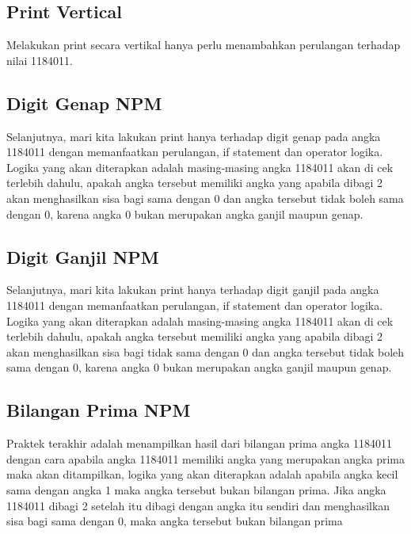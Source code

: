 \subsection{Print Vertical}
Melakukan print secara vertikal hanya perlu menambahkan perulangan terhadap nilai 1184011.

\subsection{Digit Genap NPM}
Selanjutnya, mari kita lakukan print hanya terhadap digit genap pada angka 1184011 dengan memanfaatkan perulangan, if statement dan operator logika. Logika yang akan diterapkan adalah masing-masing angka 1184011 akan di cek terlebih dahulu, apakah angka tersebut memiliki angka yang apabila dibagi 2 akan menghasilkan sisa bagi sama dengan 0 dan angka tersebut tidak boleh sama dengan 0, karena angka 0 bukan merupakan angka ganjil maupun genap.

\subsection{Digit Ganjil NPM}
Selanjutnya, mari kita lakukan print hanya terhadap digit ganjil pada angka 1184011 dengan memanfaatkan perulangan, if statement dan operator logika. Logika yang akan diterapkan adalah masing-masing angka 1184011 akan di cek terlebih dahulu, apakah angka tersebut memiliki angka yang apabila dibagi 2 akan menghasilkan sisa bagi tidak sama dengan 0 dan angka tersebut tidak boleh sama dengan 0, karena angka 0 bukan merupakan angka ganjil maupun genap.

\subsection{Bilangan Prima NPM}
Praktek terakhir adalah menampilkan hasil dari bilangan prima angka 1184011 dengan cara apabila angka 1184011 memiliki angka yang merupakan angka prima maka akan ditampilkan, logika yang akan diterapkan adalah apabila angka kecil sama dengan angka 1 maka angka tersebut bukan bilangan prima. Jika angka 1184011 dibagi 2 setelah itu dibagi dengan angka itu sendiri dan menghasilkan sisa bagi sama dengan 0, maka angka tersebut bukan bilangan prima


